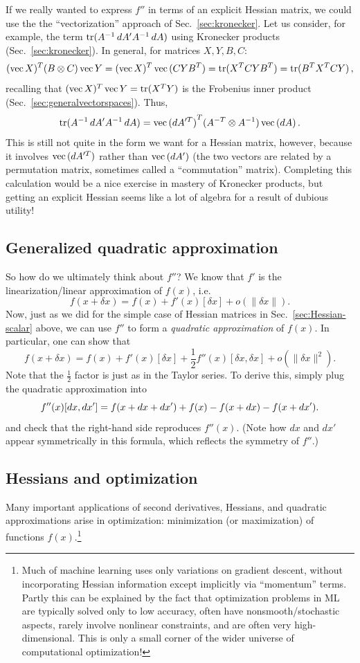 If we really wanted to express $f''$ in terms of an explicit Hessian matrix, we could use the the ``vectorization'' approach of Sec.~\ref{sec:kronecker}.
Let us consider, for example, the term $\operatorname{tr}(A^{-1} \,d A' A^{-1}\, d A)$ using Kronecker products (Sec.~\ref{sec:kronecker}).  In general, for matrices $X,Y,B,C$:
$$
(\operatorname{vec}{X})^T (B \otimes C) \operatorname{vec}{Y} = (\operatorname{vec}{X})^T \operatorname{vec}{(CYB^T)} = \operatorname{tr}(X^T CYB^T) = \operatorname{tr}(B^T X^T CY) \, ,
$$
recalling that $(\operatorname{vec}{X})^T \operatorname{vec}{Y} = \operatorname{tr}(X^T Y)$ is the Frobenius inner product (Sec.~\ref{sec:generalvectorspaces}).  Thus,
$$
\operatorname{tr}(A^{-1} \,d A' A^{-1}\, d A)
= \operatorname{vec}{(d A'^T)}^T (A^{-T} \otimes A^{-1}) \operatorname{vec}{(d A)} \, .
$$
This is still not quite in the form we want for a Hessian matrix, however, because it involves $\operatorname{vec}{(d A'^T)}$ rather than $\operatorname{vec}{(d A')}$ (the two vectors are related by a permutation matrix, sometimes called a ``commutation'' matrix). Completing this calculation would be a nice exercise in mastery of Kronecker products, but getting an explicit Hessian seems like a lot of algebra for a result of dubious utility!

\subsection{Generalized quadratic approximation}
\label{sec:Hessian-quadratic}

So how do we ultimately think about $f''$? We know that $f'$ is the linearization/linear approximation of $f(x)$, i.e. 
\[
f(x + \delta x ) = f(x) + f'(x) [\delta x] + o(\lVert \delta x\rVert).
\] 
Now, just as we did for the simple case of Hessian matrices in Sec.~\ref{sec:Hessian-scalar} above, we can use $f''$ to form a \textit{quadratic approximation} of $f(x)$. In particular, one can show that 
\[
f(x+ \delta x) = f(x) + f'(x) [\delta x] + \frac{1}{2} f''(x) [\delta x, \delta x] +  o (\lVert \delta x\rVert^2).
\]
Note that the $\frac{1}{2}$ factor is just as in the Taylor series. To derive this, simply plug the quadratic approximation into 
\[
f''(x) [d x, d x'] = f(x + d x + d x') + f(x) - f(x + d x) - f(x + d x').
\]
and check that the right-hand side reproduces $f''(x)$.   (Note how $dx$ and $dx'$ appear symmetrically in this formula, which reflects the symmetry of $f''$.)


\subsection{Hessians and optimization}

Many important applications of second derivatives, Hessians, and quadratic approximations arise in optimization: minimization (or maximization) of functions $f(x)$.\footnote{Much of machine learning uses only variations on gradient descent, without incorporating Hessian information except implicitly via ``momentum'' terms.  Partly this can be explained by the fact that optimization problems in ML are typically solved only to low accuracy, often have nonsmooth/stochastic aspects, rarely involve nonlinear constraints, and are often very high-dimensional.  This is only a small corner of the wider universe of computational optimization!}

